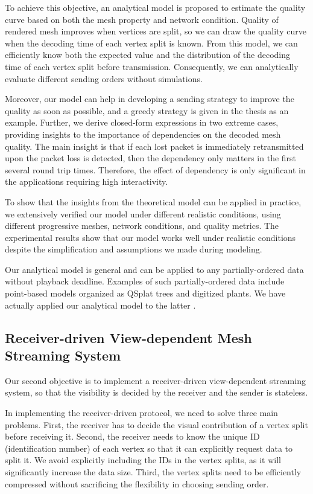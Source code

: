     To achieve this objective, an analytical model is proposed
    to estimate the quality curve based on both
    the mesh property and network condition. 
    Quality of rendered mesh improves when vertices are split,
    so we can draw the quality curve when the decoding time
    of each vertex split is known.
    From this model, we can efficiently know both the expected 
    value and the distribution of the decoding time of each
    vertex split before transmission. Consequently, 
    we can analytically evaluate different sending orders without simulations.
    
    Moreover, our model can help in developing a sending
    strategy to improve the quality as soon as possible,
    and a greedy strategy is given in the thesis as an example. 
    Further, we derive closed-form expressions in two extreme cases,
    providing insights to the importance of dependencies on the
    decoded mesh quality. The main insight is that if each lost packet
    is immediately retransmitted upon the packet loss is detected, 
    then the dependency only matters in the first several round trip times. 
    Therefore, the effect of dependency is only significant in the applications
    requiring high interactivity. 

    To show that the insights from the theoretical model can be applied
    in practice, we extensively verified our model under different realistic conditions,
    using different progressive meshes, network conditions, and quality metrics. 
    The experimental results show that our model works well under realistic 
    conditions despite the simplification and assumptions we made during
    modeling.

    Our analytical model is general and can be applied to any 
    partially-ordered data without playback deadline.
    Examples of such partially-ordered data include point-based models 
    organized as QSplat trees \cite{rusinkiewicz:qsplat} and digitized plants.  
    We have actually applied our analytical model to the latter \cite{plant:seb}.
    
    \subsection{Receiver-driven View-dependent Mesh Streaming System}
    Our second objective is to implement a receiver-driven view-dependent streaming system,
    so that the visibility is decided by the receiver and the sender is stateless.
    
    In implementing the receiver-driven protocol, we need to solve three main problems.
    First, the receiver has to decide the visual contribution 
    of a vertex split before receiving it.
    Second, the receiver needs to know the unique ID
    (identification number) of each vertex so that it
    can explicitly request data to split it. 
    We avoid explicitly including the IDs in the vertex splits,
    as it will significantly increase the data size.
    Third, the vertex splits need to be efficiently compressed without
    sacrificing the flexibility in choosing sending order.
    
